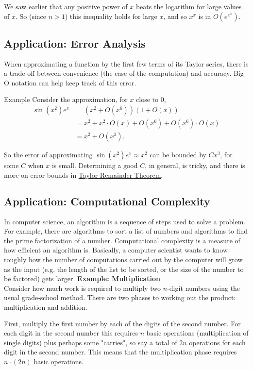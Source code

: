 \documentclass[twoside,openright,titlepage,a4paper]{book}
\begin{document}
\begin{sloppypar}
\begin{examplebox}
We saw earlier that any positive power of $x$ beats the logarithm for large values of $x$. So (since $n >1$) this inequality holds for large $x$, and so $x^x$ is in $O(e^{x^n})$.
\end{examplebox}

\subsection{Application: Error Analysis}
When approximating a function by the first few terms of its Taylor series, there is a trade-off between convenience (the ease of the computation) and accuracy. Big-O notation can help keep track of this error.

Example Consider the approximation, for $x$ close to 0,
\begin{align*}
\sin(x^2)e^x &= \left(x^2 + O(x^6)\right)(1 + O(x)) \\
& = x^2 + x^2 \cdot O(x) + O(x^6) + O(x^6)\cdot O(x) \\
& = x^2 + O(x^3). 
\end{align*}

So the error of approximating $\sin(x^2)e^x \approx x^2$ can be bounded by $Cx^3$, for some $C$ when $x$ is small. Determining a good $C$, in general, is tricky, and there is more on error bounds in \hyperref[ChTaylorRemainderTheorem]{Taylor Remainder Theorem}.

\subsection{Application: Computational Complexity}
In computer science, an algorithm is a sequence of steps used to solve a problem. For example, there are algorithms to sort a list of numbers and algorithms to find the prime factorization of a number. Computational complexity is a measure of how efficient an algorithm is. Basically, a computer scientist wants to know roughly how the number of computations carried out by the computer will grow as the input (e.g. the length of the list to be sorted, or the size of the number to be factored) gets larger.
\bigbreak
\noindent \textbf{Example: Multiplication}\\

Consider how much work is required to multiply two $n$-digit numbers using the usual grade-school method. There are two phases to working out the product: multiplication and addition.

First, multiply the first number by each of the digits of the second number. For each digit in the second number this requires $n$ basic operations (multiplication of single digits) plus perhaps some "carries", so say a total of $2n$ operations for each digit in the second number. This means that the multiplication phase requires $n \cdot (2n)$ basic operations.


\end{sloppypar}
\end{document}
